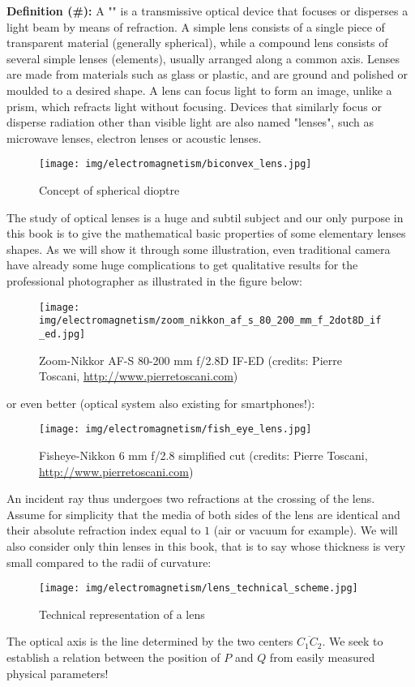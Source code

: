 	\textbf{Definition (\#\mydef):} A "" is a transmissive optical device that focuses or disperses a light beam by means of refraction. A simple lens consists of a single piece of transparent material (generally spherical), while a compound lens consists of several simple lenses (elements), usually arranged along a common axis. Lenses are made from materials such as glass or plastic, and are ground and polished or moulded to a desired shape. A lens can focus light to form an image, unlike a prism, which refracts light without focusing. Devices that similarly focus or disperse radiation other than visible light are also named "lenses", such as microwave lenses, electron lenses or acoustic lenses.
	\begin{figure}[H]
		\centering
		\texttt{[image: img/electromagnetism/biconvex\_lens.jpg]}
		\caption{Concept of spherical dioptre}
	\end{figure}
	The study of optical lenses is a huge and subtil subject and our only purpose in this book is to give the mathematical basic properties of some elementary lenses shapes. As we will show it through some illustration, even traditional camera have already some huge complications to get qualitative results for the professional photographer as illustrated in the figure below:
	\begin{figure}[H]
		\centering
		\texttt{[image: img/electromagnetism/zoom\_nikkon\_af\_s\_80\_200\_mm\_f\_2dot8D\_if\_ed.jpg]}
		\caption[Zoom-Nikkor AF-S 80-200 mm f/2.8D IF-ED]{Zoom-Nikkor AF-S 80-200 mm f/2.8D IF-ED (credits: Pierre Toscani, \url{http://www.pierretoscani.com})}
	\end{figure}
	or even better (optical system also existing for smartphones!):
	\begin{figure}[H]
		\centering
		\texttt{[image: img/electromagnetism/fish\_eye\_lens.jpg]}
		\caption[Fisheye-Nikkon 6 mm f/2.8 simplified cut]{Fisheye-Nikkon 6 mm f/2.8 simplified cut (credits: Pierre Toscani, \url{http://www.pierretoscani.com})}
	\end{figure}
	An incident ray thus undergoes two refractions at the crossing of the lens. Assume for simplicity that the media of both sides of the lens are identical and their absolute refraction index equal to $1$ (air or vacuum for example). We will also consider only thin lenses in this book, that is to say whose thickness is very small compared to the radii of curvature:
	\begin{figure}[H]
		\centering
		\texttt{[image: img/electromagnetism/lens\_technical\_scheme.jpg]}
		\caption{Technical representation of a lens}
	\end{figure}
	The optical axis is the line determined by the two centers $\overline{C_1C_2}$. We seek to establish a relation between the position of $P$ and $Q$ from easily measured physical parameters!

